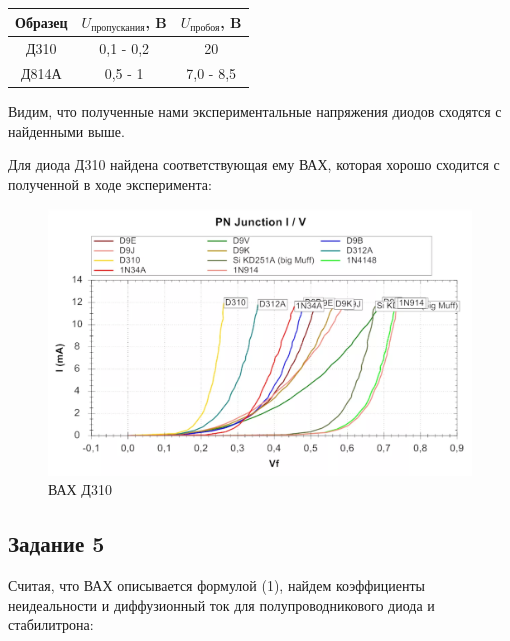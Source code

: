 \documentclass[a4paper, 12pt]{article}
\begin{document}
\begin{table}[h]
\centering
\begin{tabular}{|c|c|c|}
\hline
Образец & $U_{\text{пропускания}}$, B  & $U_{\text{пробоя}}$, B  \\ \hline
Д310    & 0,1 - 0,2 & 20 \\ \hline
Д814А    & 0,5 - 1 & 7,0 - 8,5 \\ \hline
\end{tabular}
\end{table}

Видим, что полученные нами экспериментальные напряжения диодов сходятся с найденными выше.

Для диода Д310 найдена соответствующая ему ВАХ, которая хорошо сходится с полученной в ходе эксперимента:  

\begin{figure}[!h]
    \centering
    \includegraphics[width = 0.95\linewidth]{img/theor.png}
    \caption{ВАХ Д310}
\end{figure}


\newpage

\subsection{Задание 5}
Считая, что ВАХ описывается формулой (1), найдем коэффициенты неидеальности и диффузионный ток для полупроводникового диода и стабилитрона:
\end{document}

